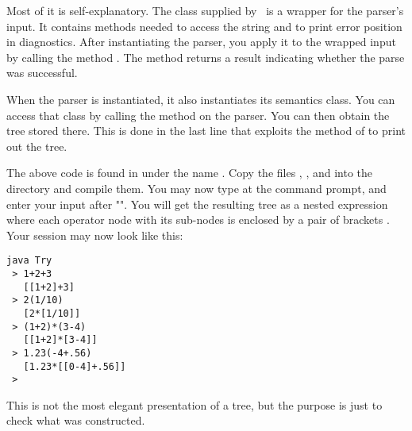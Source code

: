 \medskip
Most of it is self-explanatory. 
The class  supplied by \Mouse\ is a wrapper for the parser's input.
It contains methods needed to access the string and to print error position in diagnostics.
After instantiating the parser, you apply it to the wrapped input
by calling the method . 
The method returns a  result indicating whether the parse was successful.

When the parser is instantiated, it also instantiates its semantics class.
You can access that class by calling the method  
on the parser.
You can then obtain the tree stored there.
This is done in the last line that exploits the method 
of  to print out the tree.

The above code is found in 
under the name .
Copy the files ,\linebreak
{}, and  
into the  directory and compile them.
You may now type  at the command prompt, and enter your
input after "\tx{> }".
You will get the resulting tree as a nested expression
where each operator node with its sub-nodes is enclosed by a pair of brackets \tx{[ ]}.
Your session may now look like this:

\small
\begin{Verbatim}[samepage=true,xleftmargin=15mm,baselinestretch=0.8]
 java Try
 > 1+2+3
   [[1+2]+3]
 > 2(1/10)
   [2*[1/10]]
 > (1+2)*(3-4)
   [[1+2]*[3-4]]
 > 1.23(-4+.56)
   [1.23*[[0-4]+.56]]
 >
\end{Verbatim}
\normalsize

This is not the most elegant presentation of a tree,
but the purpose is just to check what was constructed.
